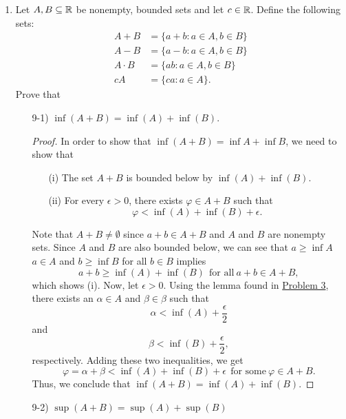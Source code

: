 \documentclass[11pt,a4paper]{article}
\begin{document}
\begin{enumerate}
\item Let \( A, B \subseteq \mathbb{R}  \) be nonempty, bounded sets and let \( c \in \mathbb{R}  \). Define the following sets:
    \begin{align*}
        A + B &= \{ a + b : a \in A, b \in B \}  \\
        A - B &= \{ a - b : a \in A , b \in B  \}  \\
        A \cdot B &= \{ ab : a \in A, b \in B \} \\
        cA &= \{ ca: a \in A \}.
    \end{align*}
    Prove that 
    \begin{enumerate}
        \item[9-1)] \( \inf(A + B) = \inf(A) + \inf(B) \).
            \begin{proof}
                In order to show that \( \inf(A+B) = \inf A + \inf B  \), we need to show that 
                \begin{enumerate}
                    \item[(i)] The set \( A + B   \) is bounded below by \( \inf(A) + \inf(B) \).
                    \item[(ii)] For every \( \epsilon > 0  \), there exists \( \varphi \in  A + B  \) such that  
                        \[  \varphi < \inf(A) + \inf(B) + \epsilon. \]
                \end{enumerate} 
                Note that \( A + B \neq \emptyset \) since \(  a + b \in A + B  \) and \( A  \) and \( B  \) are nonempty sets. Since \( A  \) and \( B  \) are also bounded below, we can see that \( a \geq \inf A  \) \( a \in A  \) and \( b \geq \inf B  \) for all \( b \in B  \) implies  
                \[  a + b \geq \inf(A) + \inf (B) \ \ \text{for all} \ a + b \in A + B,    \]
                which shows (i).
    Now, let \( \epsilon > 0 \). Using the lemma found in {\hyperref[Problem 3]{Problem 3}}, there exists an \( \alpha \in A  \) and \( \beta \in \beta  \) such that 
                \[  \alpha < \inf(A) + \frac{ \epsilon }{ 2 } \]
                and
                \[  \beta < \inf(B) + \frac{ \epsilon }{ 2 },  \]
                respectively. Adding these two inequalities, we get
                \[ \varphi =  \alpha + \beta < \inf(A) + \inf(B) + \epsilon \ \ \text{for some} \ \varphi \in A + B.  \]
                Thus, we conclude that \( \inf(A+B) = \inf(A) + \inf(B) \).  
            \end{proof}
        \item[9-2)] \( \sup (A + B) = \sup (A) + \sup (B) \) 


\end{enumerate}
\end{enumerate}
\end{document}
